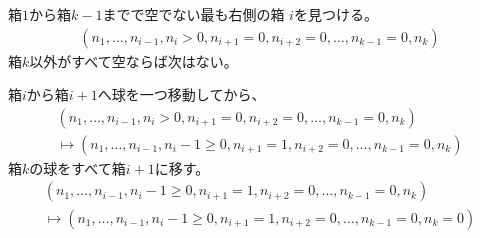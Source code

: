 	\begin{proposition}[辞書式順序で逆順に列挙する手順]
	\label{prop:辞書式順序で逆順に列挙する手順} %
		\begin{description}\setlength{\itemsep}{-1mm} %
			\item[空でない箱を探す] 箱$1$から箱$k-1$までで空でない最も右側の箱
			$i$を見つける。
			\begin{equation*}\begin{split} %
				(n_1,\dots,n_{i-1},n_i>0, n_{i+1}=0,n_{i+2}=0,\dots,n_{k-1}=0,n_k)
			\end{split}\end{equation*} %
			箱$k$以外がすべて空ならば次はない。
			\item[球を移動する] 箱$i$から箱$i+1$へ球を一つ移動してから、
			\begin{equation*}\begin{split} %
				(n_1,\dots,n_{i-1},n_i>0, n_{i+1}=0,n_{i+2}=0,\dots,n_{k-1}=0,n_k) \\
				\mapsto
				(n_1,\dots,n_{i-1},n_i-1\ge0, n_{i+1}=1,n_{i+2}=0,\dots,n_{k-1}=0,n_k)
			\end{split}\end{equation*} %
			箱$k$の球をすべて箱$i+1$に移す。
			\begin{equation*}\begin{split} %
				(n_1,\dots,n_{i-1},n_i-1\ge0, n_{i+1}=1,n_{i+2}=0,\dots,n_{k-1}=0,n_k) \\
				\mapsto
				(n_1,\dots,n_{i-1},n_i-1\ge0, n_{i+1}=1,n_{i+2}=0,\dots,n_{k-1}=0,n_k=0)
			\end{split}\end{equation*} %
		\end{description} %
	\end{proposition} %

